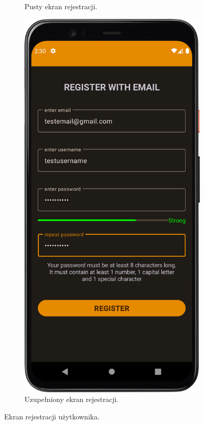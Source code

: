 \begin{figure}[!ht]
\begin{subfigure}[b]{0.3\textwidth}
                \caption{Pusty ekran rejestracji.\label{register1}}
            \end{subfigure}
            \hfill
            \begin{subfigure}[b]{0.3\textwidth}
                \centering
                \includegraphics[width=\textwidth]{src/app/register2.png}
                \caption{Uzupełniony ekran rejestracji.\label{register2}}
            \end{subfigure}
            \caption{Ekran rejestracji użytkownika.\label{register}}
            \qquad
        \end{figure} 


